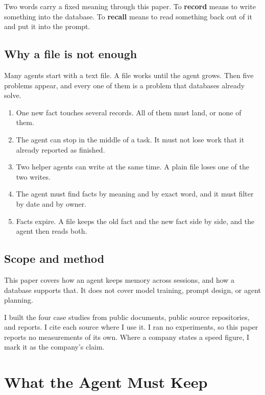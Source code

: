 \documentclass[11pt,a4paper]{article}
\begin{document}
Two words carry a fixed meaning through this paper. To \textbf{record}
means to write something into the database. To \textbf{recall} means to
read something back out of it and put it into the prompt.

\subsection{Why a file is not enough}

Many agents start with a text file. A file works until the agent grows.
Then five problems appear, and every one of them is a problem that
databases already solve.

\begin{enumerate}
  \item One new fact touches several records. All of them must land, or
        none of them.
  \item The agent can stop in the middle of a task. It must not lose
        work that it already reported as finished.
  \item Two helper agents can write at the same time. A plain file loses
        one of the two writes.
  \item The agent must find facts by meaning and by exact word, and it
        must filter by date and by owner.
  \item Facts expire. A file keeps the old fact and the new fact side by
        side, and the agent then reads both.
\end{enumerate}

\subsection{Scope and method}

This paper covers how an agent keeps memory across sessions, and how a
database supports that. It does not cover model training, prompt design,
or agent planning.

I built the four case studies from public documents, public source
repositories, and reports. I cite each source where I use it. I ran no
experiments, so this paper reports no measurements of its own. Where a
company states a speed figure, I mark it as the company's claim.

\section{What the Agent Must Keep}
\label{sec:kinds}
\end{document}
